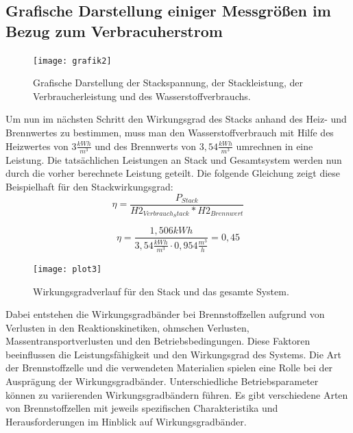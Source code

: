 \subsection{Grafische Darstellung einiger Messgrößen im Bezug zum Verbracuherstrom}
\begin{figure}[H]
    \centering
    \texttt{[image: grafik2]}
    \caption{Grafische Darstellung der Stackspannung, der
    Stackleistung, der Verbraucherleistung und des Wasserstoffverbrauchs.}
    \label{fig:plot2_26062023}
  \end{figure}
  Um nun im nächsten Schritt den Wirkungsgrad des Stacks anhand des Heiz- und Brennwertes zu bestimmen, muss man den Wasserstoffverbrauch mit Hilfe des Heizwertes von $3 \frac{kWh}{m^3}$ und des Brennwerts von $3,54 \frac{kWh}{m^3}$ umrechnen in eine Leistung. Die tatsächlichen Leistungen an Stack und Gesamtsystem werden nun durch die vorher berechnete Leistung geteilt. Die folgende Gleichung zeigt diese Beispielhaft für den Stackwirkungsgrad:
\begin{equation}
 \eta= \frac{P_{Stack}}{H2_{Verbrauch_Stack}*H2_{Brennwert}}
  \label{eq:230627_Beispiel_wirkungsgrad_Berechnung}
\end{equation}

$$\eta= \frac{1,506 kWh}{3,54 \frac{kWh}{m^3 }\cdot 0,954 \frac{m^3}{h}}=0,45$$

\begin{figure}[H]
    \centering
    \texttt{[image: plot3]}
    \caption{Wirkungsgradverlauf für den Stack und das gesamte System.}
    \label{fig:plot3_26062023}
  \end{figure}
  Dabei entstehen die Wirkungsgradbänder bei Brennstoffzellen aufgrund von Verlusten in den Reaktionskinetiken, ohmschen Verlusten, Massentransportverlusten und den Betriebsbedingungen. Diese Faktoren beeinflussen die Leistungsfähigkeit und den Wirkungsgrad des Systems.
   Die Art der Brennstoffzelle und die verwendeten Materialien spielen eine Rolle bei der Ausprägung der Wirkungsgradbänder. Unterschiedliche Betriebsparameter können zu variierenden Wirkungsgradbändern führen. Es gibt verschiedene Arten von Brennstoffzellen mit jeweils spezifischen Charakteristika und Herausforderungen im Hinblick auf Wirkungsgradbänder.
